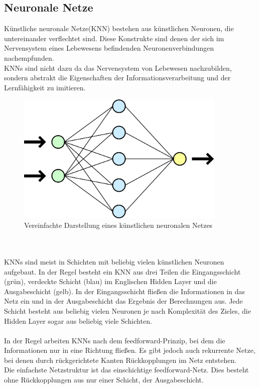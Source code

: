 \documentclass[12pt,oneside,a4paper,parskip]{scrbook}
\begin{document}
\subsection{Neuronale Netze}
Künstliche neuronale Netze(KNN) bestehen aus künstlichen Neuronen, die untereinander verflechtet sind. Diese Konstrukte sind denen der sich im Nervensystem eines Lebewesens befindenden Neuronenverbindungen nachempfunden. \\
KNNs sind nicht dazu da das Nervensystem von Lebewesen nachzubilden, sondern abstrakt die Eigenschaften der Informationsverarbeitung und der Lernfähigkeit zu imitieren.
\begin{figure}[h]
	\begin{center}
		\includegraphics[width=10cm]{Bilder/Neurales_Netz.png}
		\caption{Vereinfachte Darstellung eines künstlichen neuronalen Netzes}
		\label{fig:wikiNeuronalesNetz}
	\end{center}
\end{figure}
\\\\KNNs sind meist in Schichten mit beliebig vielen künstlichen Neuronen aufgebaut. In der Regel besteht ein KNN aus drei Teilen die Eingangsschicht (grün), verdeckte Schicht (blau) im Englischen Hidden Layer und die Ausgabeschicht (gelb). In der Eingangsschicht fließen die Informationen in das Netz ein und in der Ausgabeschicht das Ergebnis der Berechnungen aus. Jede Schicht besteht aus beliebig vielen Neuronen je nach Komplexität des Zieles, die Hidden Layer sogar aus beliebig viele Schichten.
\\\\
In der Regel arbeiten KNNs nach dem feedforward-Prinzip, bei dem die Informationen nur in eine Richtung fließen. Es gibt jedoch auch rekurrente Netze, bei denen durch rückgerichtete Kanten Rückkopplungen im Netz entstehen. \\
Die einfachste Netzstruktur ist das einschichtige feedforward-Netz. Dies besteht ohne Rückkopplungen aus nur einer Schicht, der Ausgabeschicht.
\end{document}
